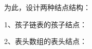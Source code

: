 \begin{frame}
为此，设计两种结点结构： \vspace{0.1in}

1、孩子链表的孩子结点：\vspace{0.1in}

\begin{figure}
\centering
        
\end{figure}
\end{frame}

\begin{frame}\ft{\subsecname}
2、表头数组的表头结点：\vspace{0.1in}

\begin{figure}
\centering
        
\end{figure}
\end{frame}
%
%
%
%

